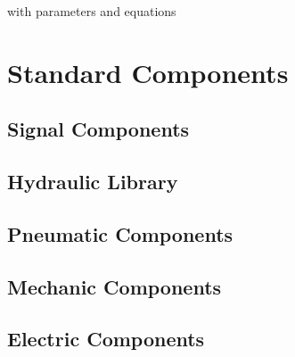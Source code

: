     with parameters and equations

\section{Standard Components}\label{app:list_of_components}

\subsection*{Signal Components}

\subsection*{Hydraulic Library}

\subsection*{Pneumatic Components}

\subsection*{Mechanic Components}

\subsection*{Electric Components}

\clearpage
